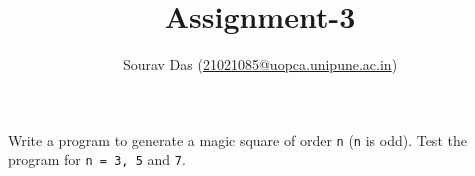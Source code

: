 \documentclass[11pt]{article} %
\title{Assignment-3}
\author{Sourav Das (\url{21021085@uopca.unipune.ac.in})}
\date{} %
\begin{document}
\maketitle

\noindent Write a program to generate a magic square of order \lstinline{n} (\lstinline{n} is odd). Test the program for \lstinline{n = 3, 5} and \lstinline{7}.

\end{document}
